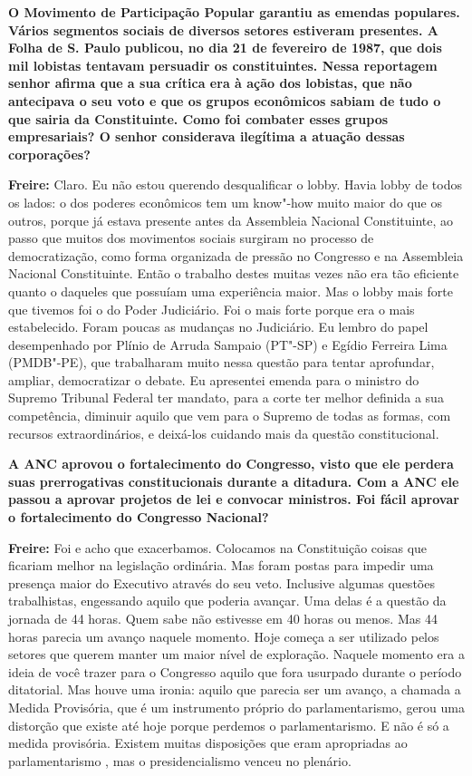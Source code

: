 \textbf{O Movimento de Participação Popular garantiu as emendas
populares. Vários segmentos sociais de diversos setores estiveram
presentes. A Folha de S. Paulo publicou, no dia 21 de fevereiro de 1987,
que dois mil lobistas tentavam persuadir os constituintes. Nessa
reportagem senhor afirma que a sua crítica era à ação dos lobistas, que
não antecipava o seu voto e que os grupos econômicos sabiam de tudo o
que sairia da Constituinte. Como foi combater esses grupos empresariais?
O senhor considerava ilegítima a atuação dessas corporações?}

\textbf{Freire:} Claro. Eu não estou querendo desqualificar o lobby.
Havia lobby de todos os lados: o dos poderes econômicos tem um know"-how
muito maior do que os outros, porque já estava presente antes da
Assembleia Nacional Constituinte, ao passo que muitos dos movimentos
sociais surgiram no processo de democratização, como forma organizada de
pressão no Congresso e na Assembleia Nacional Constituinte. Então o
trabalho destes muitas vezes não era tão eficiente quanto o daqueles que
possuíam uma experiência maior. Mas o lobby mais forte que tivemos foi o
do Poder Judiciário. Foi o mais forte porque era o mais estabelecido.
Foram poucas as mudanças no Judiciário. Eu lembro do papel desempenhado
por Plínio de Arruda Sampaio (PT"-SP) e Egídio Ferreira Lima (PMDB"-PE),
que trabalharam muito nessa questão para tentar aprofundar, ampliar,
democratizar o debate. Eu apresentei emenda para o ministro do Supremo
Tribunal Federal ter mandato, para a corte ter melhor definida a sua
competência, diminuir aquilo que vem para o Supremo de todas as formas,
com recursos extraordinários, e deixá-los cuidando mais da questão
constitucional.

\textbf{A ANC aprovou o fortalecimento do Congresso, visto que ele
perdera suas prerrogativas constitucionais durante a ditadura. Com a ANC
ele passou a aprovar projetos de lei e convocar ministros. Foi fácil
aprovar o fortalecimento do Congresso Nacional?}

\textbf{Freire:} Foi e acho que exacerbamos. Colocamos na Constituição
coisas que ficariam melhor na legislação ordinária. Mas foram postas
para impedir uma presença maior do Executivo através do seu veto.
Inclusive algumas questões trabalhistas, engessando aquilo que poderia
avançar. Uma delas é a questão da jornada de 44 horas. Quem sabe não
estivesse em 40 horas ou menos. Mas 44 horas parecia um avanço naquele
momento. Hoje começa a ser utilizado pelos setores que querem manter um
maior nível de exploração. Naquele momento era a ideia de você trazer
para o Congresso aquilo que fora usurpado durante o período ditatorial.
Mas houve uma ironia: aquilo que parecia ser um avanço, a chamada a
Medida Provisória, que é um instrumento próprio do parlamentarismo,
gerou uma distorção que existe até hoje porque perdemos o
parlamentarismo. E não é só a medida provisória. Existem muitas
disposições que eram apropriadas ao parlamentarismo , mas o
presidencialismo venceu no plenário.

